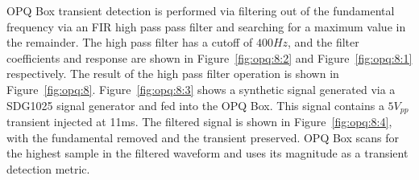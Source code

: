 OPQ Box transient detection is performed via filtering out of the fundamental frequency via an FIR high pass pass filter and searching for a maximum value in the remainder.
The high pass filter has a cutoff of $400Hz$, and the filter coefficients and response are shown in Figure~\ref{fig:opq:8:2} and Figure~\ref{fig:opq:8:1} respectively.
The result of the high pass filter operation is shown in Figure~\ref{fig:opq:8}.
Figure~\ref{fig:opq:8:3} shows a synthetic signal generated via a SDG1025 signal generator and fed into the OPQ Box.
This signal contains a $5V_{pp}$ transient injected at 11ms.
The filtered signal is shown in Figure~\ref{fig:opq:8:4}, with the fundamental removed and the transient preserved.
OPQ Box scans for the highest sample in the filtered waveform and uses its magnitude as a transient detection metric.


